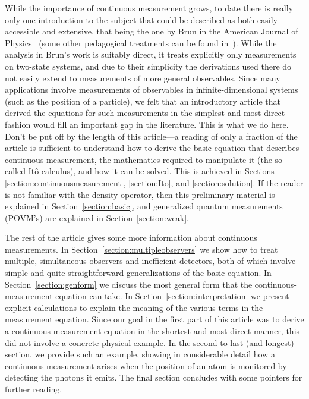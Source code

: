 \documentclass[12pt,aps,onecolum,superscriptaddress,footinbib,floatfix,showpacs]{revtex4-1}
\begin{document}
While the importance of continuous measurement grows, to date there is 
really only one introduction to the subject that could be described as 
both easily accessible and extensive, that being the one by Brun in the 
American Journal of Physics~\cite{Brun02} (some other pedagogical treatments 
can be found in~\cite{Braginsky95,Carm93,WisemanLinQ}).  While the
analysis in Brun's work is suitably direct, it treats explicitly only
measurements on two-state systems, and due to their simplicity the
derivations used there do not easily extend to measurements of more
general observables.  Since many applications involve measurements of
observables in infinite-dimensional systems (such as the position of a
particle), we felt that an introductory article that derived the
equations for such measurements in the simplest and most direct
fashion would fill an important gap in the literature.  This is what we
do here.  Don't be put off by the length of this article---a reading
of only a fraction of the article is sufficient to understand how to
derive the basic equation that describes continuous measurement, the
mathematics required to manipulate it (the so-called It\^o calculus),
and how it can be solved.  This is achieved in Sections
\ref{section:continuousmeasurement}, \ref{section:Ito}, and
\ref{section:solution}.  If the reader is not familiar with the
density operator, then this preliminary material is explained in
Section~\ref{section:basic}, and generalized quantum measurements
(POVM's) are explained in Section~\ref{section:weak}.

The rest of the article gives some more information about continuous
measurements.  In Section~\ref{section:multipleobservers} we show how
to treat multiple, simultaneous observers and inefficient detectors,
both of which involve simple and quite straightforward generalizations
of the basic equation.  In Section~\ref{section:genform} we discuss
the most general form that the continuous-measurement equation can
take.  In Section~\ref{section:interpretation} we present explicit
calculations to explain the meaning of the various terms in the
measurement equation.  Since our goal in the first part of this
article was to derive a continuous measurement equation in the
shortest and most direct manner, this did not involve a concrete
physical example.  In the second-to-last (and longest) section, we
provide such an example, showing in considerable detail how a
continuous measurement arises when the position of an atom is
monitored by detecting the photons it emits.  The final section
concludes with some pointers for further reading.
\end{document}
